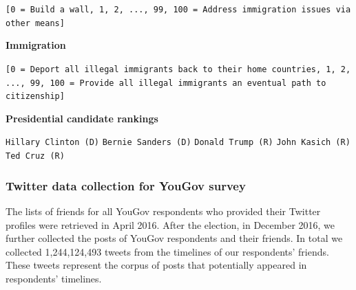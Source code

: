 \documentclass[
  12pt,
]{article}
\begin{document}
\noindent\texttt{[0 = Build a wall, 1, 2, ..., 99, 100 = Address immigration issues via other means]}\vspace{4mm}\newline

\textbf{Immigration}

\newline

\noindent\texttt{[0 = Deport all illegal immigrants back to their home countries, 1, 2, ..., 99, 100 = Provide all illegal immigrants an eventual path to citizenship]}\vspace{4mm}\newline

\textbf{Presidential candidate rankings}

\newline

\noindent\texttt{Hillary Clinton (D)}\newline
\noindent\texttt{Bernie Sanders (D)}\newline
\noindent\texttt{Donald Trump (R)}\newline
\noindent\texttt{John Kasich (R)}\newline
\noindent\texttt{Ted Cruz (R)}\newline

\clearpage

\hypertarget{twitter-data-collection-for-yougov-survey}{%
\subsubsection{Twitter data collection for YouGov survey}\label{twitter-data-collection-for-yougov-survey}}

The lists of friends for all YouGov respondents who provided their Twitter profiles were retrieved in April 2016. After the election, in December 2016, we further collected the posts of YouGov respondents and their friends. In total we collected 1,244,124,493 tweets from the timelines of our respondents' friends. These tweets represent the corpus of posts that potentially appeared in respondents' timelines.
\end{document}
